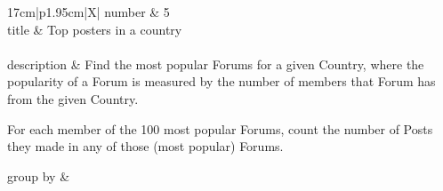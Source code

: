\renewcommand*{\arraystretch}{1.5}
\noindent\begin{tabularx}{17cm}{|p{1.95cm}|X|}
	\hline
	number      & 5                                                          \\ \hline
	title       & Top posters in a country                                                           \\ \hline
	 \\ \hline
	description & Find the most popular Forums for a given Country, where the popularity
of a Forum is measured by the number of members that Forum has from the
given Country.

For each member of the 100 most popular Forums, count the number of
Posts they made in any of those (most popular) Forums.
 \\ \hline
	
	group by       &
	\\ \hline
	

\end{tabularx}
